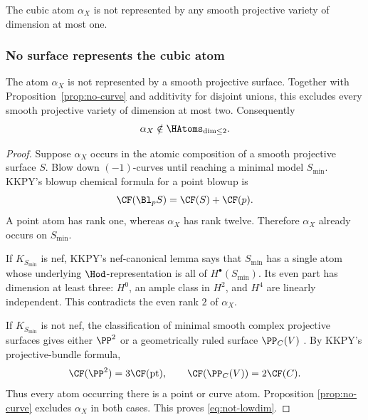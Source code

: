 \begin{proposition}\label{prop:no-curve}
%
%
%
%
The cubic atom $\alpha_X$ is not represented by any smooth projective
variety of dimension at most one.
\end{proposition}

\subsubsection{No surface represents the cubic atom}

\begin{proposition}\label{prop:no-surface}
%
%
%
%
The atom $\alpha_X$ is not represented by a smooth projective surface.
Together with Proposition~\ref{prop:no-curve} and additivity for disjoint
unions, this excludes every smooth projective variety of dimension at most
two.  Consequently
\begin{equation}\label{eq:not-lowdim}
  \alpha_X\notin\HAtoms_{\dim\le2}.
\end{equation}
\end{proposition}

\begin{proof}
Suppose $\alpha_X$ occurs in the atomic composition of a smooth projective
surface $S$.  Blow down $(-1)$-curves until reaching a minimal model
$S_{\min}$.  KKPY's blowup chemical formula for a point blowup is
\[
  \CF(\Bl_pS)=\CF(S)+\CF(p).
\]
A point atom has rank one, whereas $\alpha_X$ has rank twelve.  Therefore
$\alpha_X$ already occurs on $S_{\min}$.

If $K_{S_{\min}}$ is nef, KKPY's nef-canonical lemma says that
$S_{\min}$ has a single atom whose underlying $\Hod$-representation is all
of $H^\bullet(S_{\min})$.  Its even part has dimension at least three:
$H^0$, an ample class in $H^2$, and $H^4$ are linearly independent.  This
contradicts the even rank $2$ of $\alpha_X$.

If $K_{S_{\min}}$ is not nef, the classification of minimal smooth complex
projective surfaces gives either $\PP^2$ or a geometrically ruled surface
$\PP_C(V)$ \cite[Chapter~VI]{BeauvilleSurfaces}.  By KKPY's
projective-bundle formula,
\[
  \CF(\PP^2)=3\CF(\mathrm{pt}),
  \qquad
  \CF(\PP_C(V))=2\CF(C).
\]
Thus every atom occurring there is a point or curve atom.  Proposition
\ref{prop:no-curve} excludes $\alpha_X$ in both cases.  This proves
\eqref{eq:not-lowdim}.
%
\end{proof}


